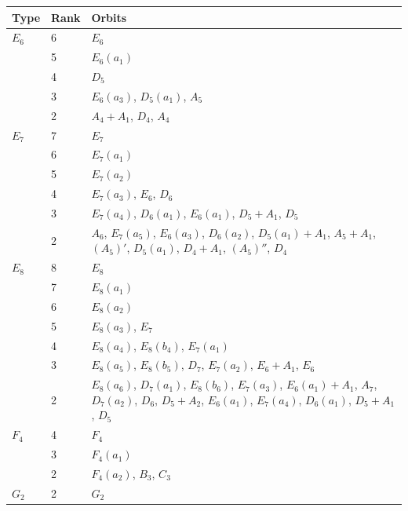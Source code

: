 \documentclass[11pt,a4paper]{article}
\theoremstyle{definition}\newtheorem{definition}[theorem]{Definition}
\theoremstyle{remark}\newtheorem{remark}[theorem]{Remark}
\begin{document}
\begin{longtable}{@{}p{.08\linewidth}p{.08\linewidth}p{.74\linewidth}@{}}
\toprule\noalign{}
\begin{minipage}[b]{\linewidth}\raggedright
Type
\end{minipage} & \begin{minipage}[b]{\linewidth}\raggedleft
Rank
\end{minipage} & \begin{minipage}[b]{\linewidth}\raggedright
Orbits
\end{minipage} \\
\midrule\noalign{}
\endhead
\bottomrule\noalign{}
\endlastfoot
\(E_6\) & 6 & \(E_6\) \\
& 5 & \(E_6(a_1)\) \\
& 4 & \(D_5\) \\
& 3 & \(E_6(a_3)\), \(D_5(a_1)\), \(A_5\) \\
& 2 & \(A_4+A_1\), \(D_4\), \(A_4\) \\
\(E_7\) & 7 & \(E_7\) \\
& 6 & \(E_7(a_1)\) \\
& 5 & \(E_7(a_2)\) \\
& 4 & \(E_7(a_3)\), \(E_6\), \(D_6\) \\
& 3 & \(E_7(a_4)\), \(D_6(a_1)\), \(E_6(a_1)\), \(D_5+A_1\), \(D_5\) \\
& 2 & \(A_6\), \(E_7(a_5)\), \(E_6(a_3)\), \(D_6(a_2)\), \(D_5(a_1)+A_1\), \(A_5+A_1\), \((A_5)'\), \(D_5(a_1)\), \(D_4+A_1\), \((A_5)''\), \(D_4\) \\
\(E_8\) & 8 & \(E_8\) \\
& 7 & \(E_8(a_1)\) \\
& 6 & \(E_8(a_2)\) \\
& 5 & \(E_8(a_3)\), \(E_7\) \\
& 4 & \(E_8(a_4)\), \(E_8(b_4)\), \(E_7(a_1)\) \\
& 3 & \(E_8(a_5)\), \(E_8(b_5)\), \(D_7\), \(E_7(a_2)\), \(E_6+A_1\), \(E_6\) \\
& 2 & \(E_8(a_6)\), \(D_7(a_1)\), \(E_8(b_6)\), \(E_7(a_3)\), \(E_6(a_1)+A_1\), \(A_7\), \(D_7(a_2)\), \(D_6\), \(D_5+A_2\), \(E_6(a_1)\), \(E_7(a_4)\), \(D_6(a_1)\), \(D_5+A_1\), \(D_5\) \\
\(F_4\) & 4 & \(F_4\) \\
& 3 & \(F_4(a_1)\) \\
& 2 & \(F_4(a_2)\), \(B_3\), \(C_3\) \\
\(G_2\) & 2 & \(G_2\) \\
\end{longtable}
\end{document}

